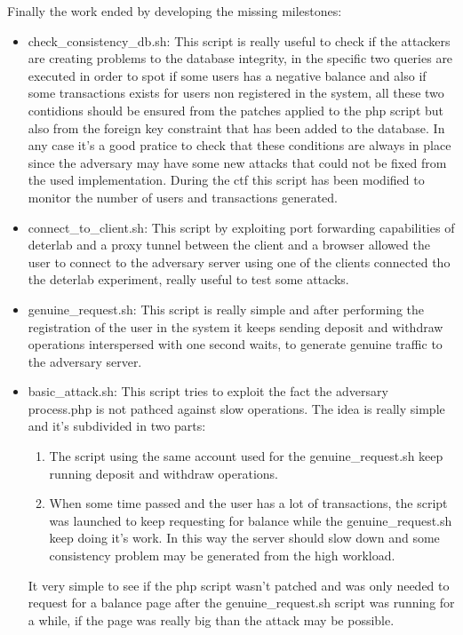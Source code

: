 \documentclass[14pt]{article}
\begin{document}
Finally the work ended by developing the missing milestones:
\begin{itemize}
	\item check\_consistency\_db.sh: This script is really useful to check if the attackers are creating problems to the database integrity, in the specific two queries are executed in order to spot if some users has a negative balance and also if some transactions exists for users non registered in the system, all these two contidions should be ensured from the patches applied to the php script but also from the foreign key constraint that has been added to the database. In any case it's a good pratice to check that these conditions are always in place since the adversary may have some new attacks that could not be fixed from the used implementation. During the ctf this script has been modified to monitor the number of users and transactions generated.
	
	\item connect\_to\_client.sh: This script by exploiting port forwarding capabilities of deterlab and a proxy tunnel between the client and a browser allowed the user to connect to the adversary server using one of the clients connected tho the deterlab experiment, really useful to test some attacks.
	
	\item genuine\_request.sh: This script is really simple and after performing the registration of the user in the system it keeps sending deposit and withdraw operations 
	interspersed with one second waits, to generate genuine traffic to the adversary server.
	
	\item basic\_attack.sh: This script tries to exploit the fact the adversary process.php is not pathced against slow operations. The idea is really simple and it's subdivided in two parts:
	\begin{enumerate}
		\item The script using the same account used for the genuine\_request.sh keep running deposit and withdraw operations.
		\item When some time passed and the user has a lot of transactions, the script was launched to keep requesting for balance while the genuine\_request.sh keep doing it's work. In this way the server should slow down and some consistency problem may be generated from the high workload.
	\end{enumerate} 
	It very simple to see if the php script wasn't patched and was only needed to request for a balance page after the genuine\_request.sh script was running for a while, if the page was really big than the attack may be possible.
	

\end{itemize}
\end{document}
